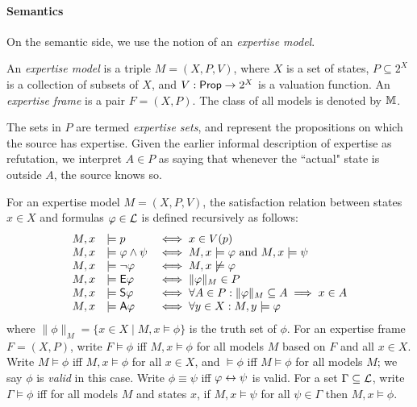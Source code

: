 \paragraph{Semantics}

On the semantic side, we use the notion of an \emph{expertise model}.

\begin{definition}
    \label{def_expertise_model}

    An \emph{expertise model} is a triple $M = (X, P, V)$, where $X$ is a set
    of states, $P \subseteq 2^X$ is a collection of subsets of $X$, and $V:
    \mathsf{Prop} \to 2^X$ is a valuation function. An \emph{expertise frame} is a pair
    $F = (X, P)$.  The class of all models is denoted by $\mathbb{M}$.

\end{definition}

The sets in $P$ are termed \emph{expertise sets}, and represent the
propositions on which the source has expertise. Given the earlier informal
description of expertise as refutation, we interpret $A \in P$ as saying
that whenever the ``actual" state is outside $A$, the source knows so.

For an expertise model $M = (X, P, V)$, the satisfaction relation between
states $x \in X$ and formulas $\varphi \in \mathcal{L}$ is defined recursively
as follows:
\[
    \begin{array}{lll}
     M, x &\models p &\iff x \in V(p) \\
     M, x &\models \varphi \land \psi &\iff M, x \models \varphi \text{ and } M, x
         \models \psi \\
     M, x &\models \neg\varphi &\iff M, x \not\models \varphi \\
     M, x &\models \mathsf{E}\varphi &\iff \|\varphi\|_M \in P \\
     M, x &\models \mathsf{S}\varphi &\iff \forall A \in P: \|\varphi\|_M \subseteq A \implies
         x \in A \\
     M, x &\models \mathsf{A}\varphi &\iff \forall y \in X: M, y \models \varphi
    \end{array}
\]
where $\|\phi\|_M = \{x \in X \mid M, x \models \phi\}$ is the truth set
of $\phi$. For an expertise frame $F = (X, P)$, write $F
\models \phi$ iff $M, x \models \phi$ for all models $M$ based on
$F$ and all $x \in X$. Write $M \models \phi$ iff
$M, x \models \phi$ for all $x \in X$, and $\models \phi$ iff
$M \models \phi$ for all models $M$; we say $\phi$ is \emph{valid}
in this case. Write $\phi \equiv \psi$ iff $\varphi \leftrightarrow \psi$ is
valid. For a set $\Gamma \subseteq \mathcal{L}$, write $\Gamma \models
\phi$ iff for all models $M$ and states $x$, if $M, x \models
\psi$ for all $\psi \in \Gamma$ then $M, x \models \phi$.

